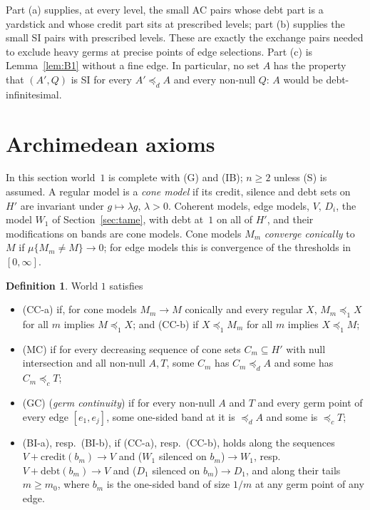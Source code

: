 \documentclass[11pt]{article}
\theoremstyle{definition}\newtheorem{definition}[theorem]{Definition}
\theoremstyle{remark}\newtheorem{remark}[theorem]{Remark}
\newcommand{\debt}{\mathrm{debt}}
\newcommand{\cred}{\mathrm{credit}}
\begin{document}
\noindent Part (a) supplies, at every level, the small AC pairs whose debt
part is a yardstick and whose credit part sits at prescribed levels; part (b)
supplies the small SI pairs with prescribed levels. These are exactly the
exchange pairs needed to exclude heavy germs at precise points of edge
selections. Part (c) is Lemma~\ref{lem:B1} without a fine edge. In
particular, no set $A$ has the property that $(A',Q)$ is SI for every
$A'\preceq_dA$ and every non-null $Q$: $A$ would be debt-infinitesimal.

\section{Archimedean axioms}\label{sec:arch}

In this section world~$1$ is complete with (G) and (IB); $n\ge2$ unless (S)
is assumed. A regular model is a \emph{cone model} if its credit, silence
and debt sets on $H'$ are invariant under $g\mapsto\lambda g$, $\lambda>0$.
Coherent models, edge models, $V$, $D_i$, the model $W_1$ of
Section~\ref{sec:tame}, with debt at~$1$ on all of $H'$, and their modifications on bands are cone models. Cone
models $M_m$ \emph{converge conically} to $M$ if $\mu\{M_m\ne M\}\to0$; for
edge models this is convergence of the thresholds in $[0,\infty]$.

\begin{definition}\label{def:arch}
World $1$ satisfies
\begin{itemize}[leftmargin=*,itemsep=1pt]
\item (CC-a) if, for cone models $M_m\to M$ conically and every regular $X$,
$M_m\preceq_1X$ for all $m$ implies $M\preceq_1X$; and (CC-b) if
$X\preceq_1M_m$ for all $m$ implies $X\preceq_1M$;
\item (MC) if for every decreasing sequence of cone sets $C_m\subseteq H'$
with null intersection and all non-null $A,T$, some $C_m$ has
$C_m\preceq_dA$ and some has $C_m\preceq_cT$;
\item (GC) (\emph{germ continuity}) if for every non-null $A$ and $T$ and
every germ point of every edge $[e_1,e_j]$, some one-sided band at it is
$\preceq_dA$ and some is $\preceq_cT$;
\item (BI-a), resp.\ (BI-b), if (CC-a), resp.\ (CC-b), holds along the
sequences $V+\cred(b_m)\to V$ and ($W_1$ silenced on $b_m$)$\to W_1$, resp.\
$V+\debt(b_m)\to V$ and ($D_1$ silenced on $b_m$)$\to D_1$, and along their
tails $m\ge m_0$, where $b_m$ is the one-sided band of size $1/m$ at any germ
point of any edge.
\end{itemize}
\end{definition}
\end{document}

